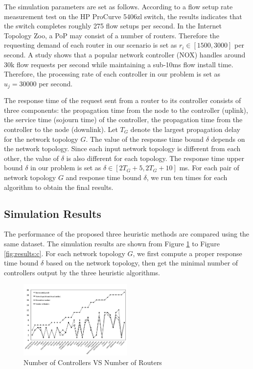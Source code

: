 \documentclass[conference]{IEEEtran}
\begin{document}
The simulation parameters are set as follows. 
According to a flow setup rate measurement test \cite{curtis2011devoflow} on the HP ProCurve 5406zl switch, the results indicates that the switch completes roughly 275 flow setups per second. In the Internet Topology Zoo, a PoP may consist of a number of routers. Therefore the requesting demand of each router in our scenario is set as $r_i\in[1500, 3000]$ per second. A study \cite{tavakoli2009applying} shows that a popular network controller (NOX) handles around 30k flow requests per second while maintaining a sub-10ms flow install time. Therefore, the processing rate of each controller in our problem is set as $u_j=30000$ per second. 

The response time of the request sent from a router to its controller consists of three components: the propagation time from the node to the controller (uplink), the service time (sojourn time) of the controller, the propagation time from the controller to the node (downlink). Let $T_{G}$ denote the largest propagation delay for the network topology $G$. The value of the response time bound $\delta$ depends on the network topology. Since each input network topology is different from each other, the value of $\delta$ is also different for each topology. The response time upper bound $\delta$ in our problem is set as $\delta \in [2T_G+5, 2T_G+10]$ ms. For each pair of network topology $G$ and response time bound $\delta$, we run ten times for each algorithm to obtain the final results. 

\subsection{Simulation Results}
The performance of the proposed three heuristic methods are compared using the same dataset. The simulation results are shown from Figure \ref{fig:results:a} to Figure \ref{fig:results:c}. For each network topology $G$, we first compute a proper response time bound $\delta$ based on the network topology, then get the minimal number of controllers output by the three heuristic algorithms. 

\begin{figure}[!htbp]
\center
\includegraphics[width=0.50\textwidth]{fig/first.jpg}
\caption{Number of Controllers VS Number of Routers}
\label{fig:results:a}
\end{figure}
\end{document}
